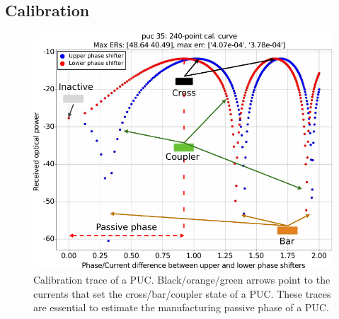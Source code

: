 \subsection{Calibration}\label{sub:calibration} %

\begin{figure}[h]
	\begin{center}
		\includegraphics{figures/ch2-sw-calib.pdf}
	\end{center}
	\caption{Calibration trace of a PUC.
		Black/orange/green arrows point to the currents that set the cross/bar/coupler state of a PUC.
		These traces are essential to estimate the manufacturing passive phase of a PUC.
	}\label{fig:ch2-sw-calib}
\end{figure}

